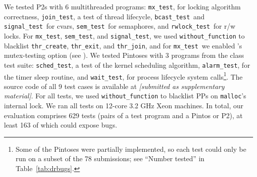 \newcommand\mxtest{\texttt{mx\_test}}
\newcommand\tej{\texttt{join\_test}}
\newcommand\bct{\texttt{bcast\_test}}
\newcommand\paraguay{\texttt{signal\_test}}
\newcommand\paradise{\texttt{sem\_test}}
\newcommand\rwldgr{\texttt{rwlock\_test}}
\newcommand\prisema{\texttt{sched\_test}}
\newcommand\waitsimple{\texttt{wait\_test}}
\newcommand\alarmsimul{\texttt{alarm\_test}}

We tested P2s with 6 multithreaded programs:
\mxtest, for locking algorithm correctness,
\tej, a test of thread lifecycle,
\bct~and \paraguay~for cvars,
\paradise~for semaphores,
and \rwldgr~for r/w locks.
For \mxtest, \paradise, and \paraguay, we used {\tt without\_function} to blacklist {\tt thr\_create}, {\tt thr\_exit}, and {\tt thr\_join},
and for \mxtest~we enabled \landslide's mutex-testing option
(see \sect{\ref{sec:landslide}}).
We tested Pintoses with 3 programs from the class test suite: \prisema, a test of the kernel scheduling algorithm,
\alarmsimul, for the timer sleep routine,
and \waitsimple, for process lifecycle system calls\footnote{
	Some of the Pintoses were partially implemented,
	so each test could only be run on a subset of the 78 submissions; see ``Number tested'' in Table~\ref{tab:drbugs}.
}.
The source code of all 9 test cases is available at
{\em [submitted as supplementary material]}.
For all tests, we used {\tt without\_function} to blacklist PPs on {\tt malloc}'s internal lock.
We ran all tests on 12-core 3.2 GHz Xeon machines. %
In total, our evaluation comprises 629 tests (pairs of a test program and a Pintos or P2),
at least 163 of which could expose bugs.

